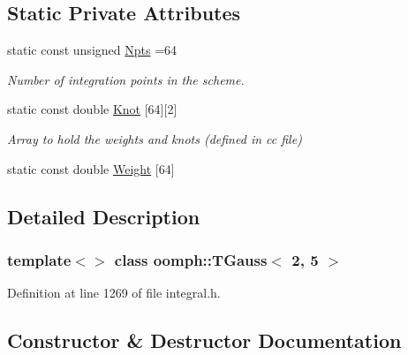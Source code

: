 \subsection*{Static Private Attributes}
\begin{DoxyCompactItemize}
\item 
static const unsigned \hyperlink{classoomph_1_1TGauss_3_012_00_015_01_4_a73143008f48d015ee81725470845a876}{Npts} =64
\begin{DoxyCompactList}\small\item\em Number of integration points in the scheme. \end{DoxyCompactList}\item 
static const double \hyperlink{classoomph_1_1TGauss_3_012_00_015_01_4_a73e2240faee36e8e48fdae037dd83619}{Knot} \mbox{[}64\mbox{]}\mbox{[}2\mbox{]}
\begin{DoxyCompactList}\small\item\em Array to hold the weights and knots (defined in cc file) \end{DoxyCompactList}\item 
static const double \hyperlink{classoomph_1_1TGauss_3_012_00_015_01_4_a1ac3ff2579c0660ccfcaaacdc1e09189}{Weight} \mbox{[}64\mbox{]}
\end{DoxyCompactItemize}


\subsection{Detailed Description}
\subsubsection*{template$<$$>$\newline
class oomph\+::\+T\+Gauss$<$ 2, 5 $>$}



Definition at line 1269 of file integral.\+h.



\subsection{Constructor \& Destructor Documentation}
\mbox{\label{classoomph_1_1TGauss_3_012_00_015_01_4_a7f996e669df1c221fb5ab3afb63564ee}} 
